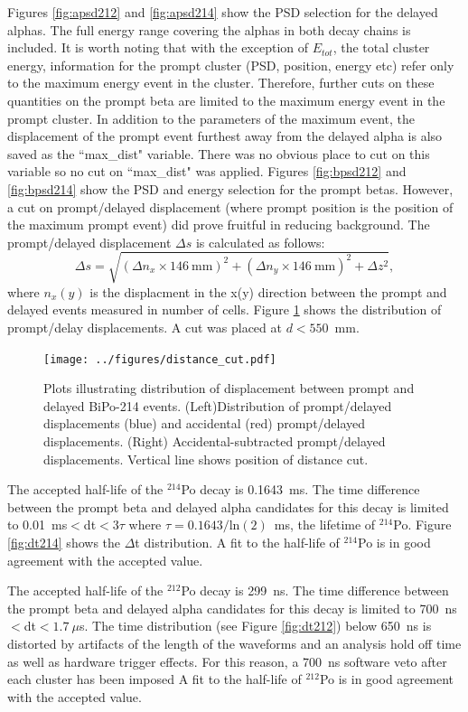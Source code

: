 Figures \ref{fig:apsd212} and \ref{fig:apsd214} show the PSD selection for the delayed alphas. The full energy range covering the alphas in both decay chains is included.
It is worth noting that with the exception of $E_{tot}$, the total cluster energy, information for the prompt cluster (PSD, position, energy etc) refer only to the maximum energy event in the cluster. Therefore, further cuts on these quantities on the prompt beta are limited to the maximum energy event in the prompt cluster. In addition to the parameters of the maximum event, the displacement of the prompt event furthest away from the delayed alpha is also saved as the ``max\_dist" variable. There was no obvious place to cut on this variable so no cut on ``max\_dist" was applied. Figures \ref{fig:bpsd212} and \ref{fig:bpsd214} show the PSD and energy selection for the prompt betas. 
However, a cut on prompt/delayed displacement (where prompt position is the position of the maximum prompt event) did prove fruitful in reducing background. The prompt/delayed displacement $\Delta s$ is calculated as follows:
\[
\Delta s=\sqrt{(\Delta n_x\times 146~\textrm{mm})^2+(\Delta n_y\times146~\textrm{mm})^2 + \Delta z^2},
\]
where $n_x(y)$ is the displacment in the x(y) direction between the prompt and delayed events measured in number of cells. Figure \ref{fig:deltaD} shows the distribution of prompt/delay displacements. A cut was placed at $d<550$~mm.
\begin{figure}[ht]
\centering
\texttt{[image: ../figures/distance\_cut.pdf]}
\caption{\label{fig:deltaD}Plots illustrating distribution of displacement between prompt and delayed BiPo-214 events. (Left)Distribution of prompt/delayed displacements (blue) and accidental (red) prompt/delayed displacements. (Right) Accidental-subtracted prompt/delayed displacements. Vertical line shows position of distance cut.}
\end{figure}

The accepted half-life of the $^{214}$Po decay is 0.1643~ms. The time difference between the prompt beta and delayed alpha candidates for this decay is limited to 0.01~ms$<$dt$<3\tau$ where $\tau=0.1643/\textrm{ln}(2)$~ms, the lifetime of $^{214}$Po. Figure \ref{fig:dt214} shows the $\Delta$t distribution. A fit to the half-life of $^{214}$Po is in good agreement with the accepted value.

The accepted half-life of the $^{212}$Po decay is 299~ns. The time difference between the prompt beta and delayed alpha candidates for this decay is limited to 700~ns$<$dt$<1.7~\mu$s. The time distribution (see Figure \ref{fig:dt212}) below 650~ns is distorted by artifacts of the length of the waveforms and an analysis hold off time as well as hardware trigger effects.  For this reason, a 700~ns software veto after each cluster has been imposed  A fit to the half-life of $^{212}$Po is in good agreement with the accepted value. 

